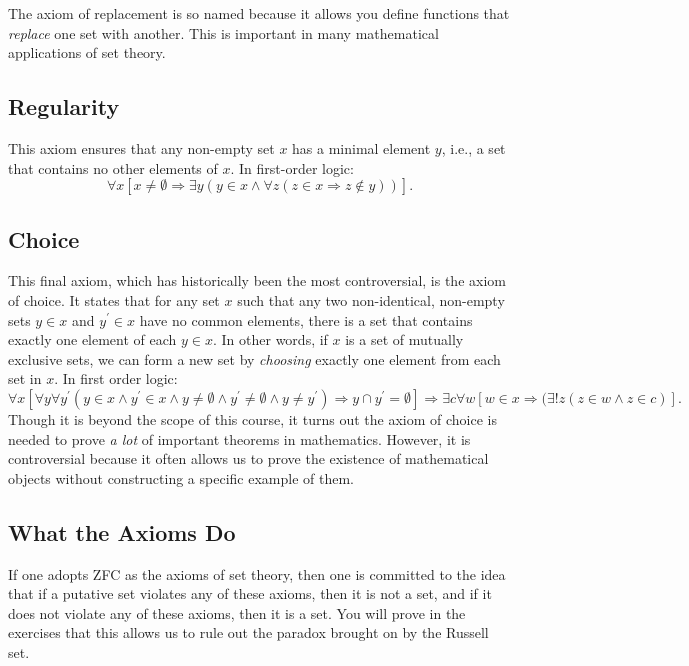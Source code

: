 \documentclass[11pt]{article}
\theoremstyle{definition}
\theoremstyle{remark}
\begin{document}
The axiom of replacement is so named because it allows you define functions that \textit{replace} one set with another. This is important in many mathematical applications of set theory.\par


\subsection{Regularity}
This axiom ensures that any non-empty set $x$ has a minimal element $y$, i.e., a set that contains no other elements of $x$. In first-order logic:
$$\forall x \left[x\neq \emptyset \Rightarrow \exists y \left(y\in x \wedge \forall z (z\in x \Rightarrow z\not\in y)\right)\right].$$



\subsection{Choice}
This final axiom, which has historically been the most controversial, is the axiom of choice. It states that for any set $x$ such that any two non-identical, non-empty sets $y\in x$ and $y^{\prime}\in x$ have no common elements, there is a set that contains exactly one element of each $y\in x$. In other words, if $x$ is a set of mutually exclusive sets, we can form a new set by \textit{choosing} exactly one element from each set in $x$. In first order logic:
\small
$$\forall x \left[\forall y\forall y^{\prime}(y\in x \wedge y^{\prime} \in x \wedge y\neq\emptyset \wedge y^{\prime} \neq \emptyset \wedge y\neq y^{\prime}
) \Rightarrow y\cap y^{\prime} = \emptyset \right]\Rightarrow \exists c\forall w\left[w\in x\Rightarrow(\exists!z(z\in w \wedge z\in c) \right].$$
\normalsize
Though it is beyond the scope of this course, it turns out the axiom of choice is needed to prove \textit{a lot} of important theorems in mathematics. However, it is controversial because it often allows us to prove the existence of mathematical objects without constructing a specific example of them.


\subsection{What the Axioms Do}
If one adopts ZFC as the axioms of set theory, then one is committed to the idea that if a putative set violates any of these axioms, then it is not a set, and if it does not violate any of these axioms, then it is a set. You will prove in the exercises that this allows us to rule out the paradox brought on by the Russell set.
\end{document}
